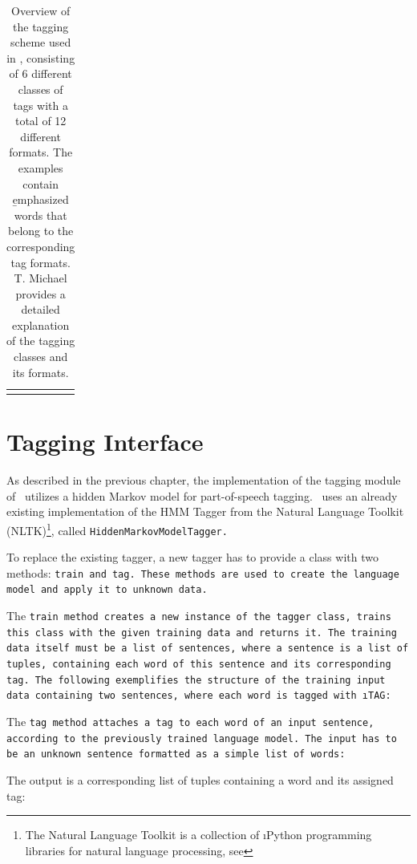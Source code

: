 \begin{table}[H]
\begin{tabular}{ p{2mm} L{48mm} p{35mm} p{40mm} }
	\brule
	\end{tabular}
	\caption[Tagging Scheme Overview]{Overview of the tagging scheme used in \Alex, consisting of 6 different classes of tags with a total of 12 different formats. The examples contain \b{emphasized} words that belong to the corresponding tag formats. T. Michael \cite{michael2016} provides a detailed explanation of the tagging classes and its formats.}
	\label{t.tagging_scheme}
	\vspace{1ex}
\end{table}

\section{Tagging Interface}\label{c.alex.tagging}
As described in the previous chapter, the implementation of the tagging module of \Alex\ utilizes a hidden Markov model for part-of-speech tagging. \Alex\ uses an already existing implementation of the HMM Tagger from the Natural Language Toolkit (NLTK)\footnote{The Natural Language Toolkit is a collection of \i{Python} programming libraries for natural language processing, see }, called \tt{HiddenMarkovModelTagger}.

To replace the existing tagger, a new tagger has to provide a class with two methods: \tt{train} and \tt{tag}. These methods are used to create the language model and apply it to unknown data.

The \tt{train} method creates a new instance of the tagger class, trains this class with the given training data and returns it. The training data itself must be a list of sentences, where a sentence is a list of tuples, containing each word of this sentence and its corresponding tag. The following exemplifies the structure of the training input data containing two sentences, where each word is tagged with \i{TAG}:



The \tt{tag} method attaches a tag to each word of an input sentence, according to the previously trained language model. The input has to be an unknown sentence formatted as a simple list of words:



The output is a corresponding list of tuples containing a word and its assigned tag:




